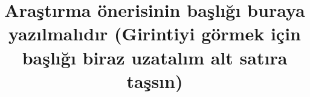 \documentclass{tubitak2219bf} %
\title{Araştırma önerisinin başlığı buraya yazılmalıdır (Girintiyi görmek için başlığı 
       biraz uzatalım alt satıra taşsın)}%
\begin{document}
\hokuspokus
\end{document}
